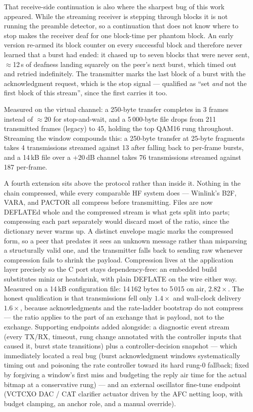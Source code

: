 That receive-side continuation is also where the sharpest bug of this
work appeared.  While the streaming receiver is stepping through
blocks it is not running the preamble detector, so a continuation that
does not know where to stop makes the receiver deaf for one block-time
per phantom block.  An early version re-armed its block counter on
every successful block and therefore never learned that a burst had
ended: it chased up to seven blocks that were never sent,
$\approx$12\,s of deafness landing squarely on the peer's next burst,
which timed out and retried indefinitely.  The transmitter marks the
last block of a burst with the acknowledgment request, which is the
stop signal --- qualified as ``set \emph{and} not the first block of
this stream'', since the first carries it too.

Measured on the virtual channel: a 250-byte transfer completes in
3 frames instead of $\approx$20 for stop-and-wait, and a 5\,000-byte
file drops from 211 transmitted frames (legacy) to 45, holding the top
QAM16 rung throughout.  Streaming the window compounds this: a
250-byte transfer at 25-byte fragments takes 4 transmissions streamed
against 13 after falling back to per-frame bursts, and a 14\,kB file
over a $+20$\,dB channel takes 76 transmissions streamed against 187
per-frame.

A fourth extension sits above the protocol rather than inside it.
Nothing in the chain compressed, while every comparable HF system does
--- Winlink's B2F, VARA, and PACTOR all compress before transmitting.
Files are now DEFLATEd whole and the compressed stream is what gets
split into parts; compressing each part separately would discard most
of the ratio, since the dictionary never warms up.  A distinct envelope
magic marks the compressed form, so a peer that predates it sees an
unknown message rather than misparsing a structurally valid one, and
the transmitter falls back to sending raw whenever compression fails to
shrink the payload.  Compression lives at the application layer
precisely so the C port stays dependency-free: an embedded build
substitutes miniz or heatshrink, with plain DEFLATE on the wire either
way.  Measured on a 14\,kB configuration file: 14\,162 bytes to
5\,015 on air, $2.82\times$.  The honest qualification is that
transmissions fell only $1.4\times$ and wall-clock delivery
$1.6\times$, because acknowledgments and the rate-ladder bootstrap do
not compress --- the ratio applies to the part of an exchange that is
payload, not to the exchange.  Supporting endpoints added alongside: a
diagnostic event stream (every TX/RX, timeout, rung change annotated
with the controller inputs that caused it, burst state transitions)
plus a controller-decision snapshot --- which immediately located a
real bug (burst acknowledgment windows systematically timing out and
poisoning the rate controller toward its hard rung-0 fallback; fixed by
forgiving a window's first miss and budgeting the reply air time for
the actual bitmap at a conservative rung) --- and an external
oscillator fine-tune endpoint (VCTCXO DAC / CAT clarifier actuator
driven by the AFC netting loop, with budget clamping, an anchor role,
and a manual override).

